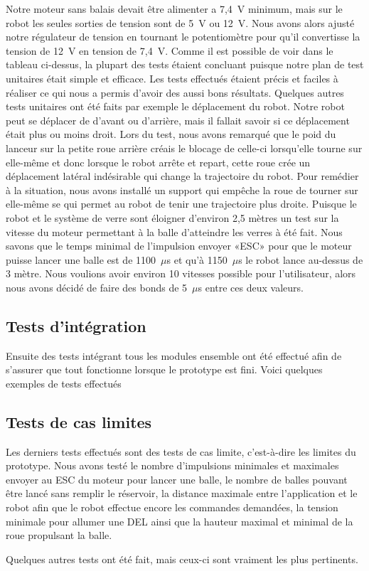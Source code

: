 Notre moteur sans balais devait être alimenter a 7,4~V minimum, mais sur le robot les seules sorties de tension sont de 5~V ou 12~V.
Nous avons alors ajusté notre régulateur de tension en tournant le potentiomètre pour qu’il convertisse la tension de 12~V en tension de 7,4~V.
Comme il est possible de voir dans le tableau ci-dessus, la plupart des tests étaient concluant puisque notre plan de test unitaires était simple et efficace.
Les tests effectués étaient précis et faciles à réaliser ce qui nous a permis d’avoir des aussi bons résultats.
Quelques autres tests unitaires ont été faits par exemple le déplacement du robot.
Notre robot peut se déplacer de d’avant ou d’arrière, mais il fallait savoir si ce déplacement était plus ou moins droit.
Lors du test, nous avons remarqué que le poid du lanceur sur la petite roue arrière créais le blocage de celle-ci lorsqu’elle tourne sur elle-même et donc lorsque le robot arrête et repart, cette roue crée un déplacement latéral indésirable qui change la trajectoire du robot.
Pour remédier à la situation, nous avons installé un support qui empêche la roue de tourner sur elle-même se qui permet au robot de tenir une trajectoire plus droite.
Puisque le robot et le système de verre sont éloigner d’environ 2,5 mètres un test sur la vitesse du moteur permettant à la balle d’atteindre les verres à été fait.
Nous savons que le temps minimal de l’impulsion envoyer «ESC» pour que le moteur puisse lancer une balle est de 1100~$\mu$s et qu’à 1150~$\mu$s le robot lance au-dessus de 3 mètre.
Nous voulions avoir environ 10 vitesses possible pour l’utilisateur, alors nous avons décidé de faire des bonds de 5~$\mu$s entre ces deux valeurs.

\subsection{Tests d'intégration}

Ensuite des tests intégrant tous les modules ensemble ont été effectué afin de s’assurer que tout fonctionne lorsque le prototype est fini.
Voici quelques exemples de tests effectués


\subsection{Tests de cas limites}

Les derniers tests effectués sont des tests de cas limite, c’est-à-dire les limites du prototype.
Nous avons testé le nombre d’impulsions minimales et maximales envoyer au ESC du moteur pour lancer une balle, le nombre de balles pouvant être lancé sans remplir le réservoir, la distance maximale entre l’application et le robot afin que le robot effectue encore les commandes demandées, la tension minimale pour allumer une DEL ainsi que la hauteur maximal et minimal de la roue propulsant la balle.


Quelques autres tests ont été fait, mais ceux-ci sont vraiment les plus pertinents.
